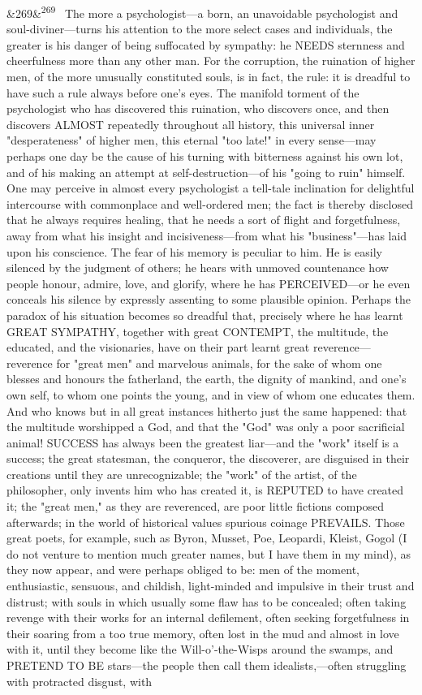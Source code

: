 \documentclass[12pt]{article}
\newcommand{\para}[1][]{\par\noindent\ifx&#1&\else\textsuperscript{\footnotesize #1}~\fi}
\begin{document}
\para[269] The more a psychologist---a born, an unavoidable psychologist and soul-diviner---turns his attention to the more select cases and individuals, the greater is his danger of being suffocated by sympathy: he NEEDS sternness and cheerfulness more than any other man. For the corruption, the ruination of higher men, of the more unusually constituted souls, is in fact, the rule: it is dreadful to have such a rule always before one's eyes. The manifold torment of the psychologist who has discovered this ruination, who discovers once, and then discovers ALMOST repeatedly throughout all history, this universal inner "desperateness" of higher men, this eternal "too late!" in every sense---may perhaps one day be the cause of his turning with bitterness against his own lot, and of his making an attempt at self-destruction---of his "going to ruin" himself. One may perceive in almost every psychologist a tell-tale inclination for delightful intercourse with commonplace and well-ordered men; the fact is thereby disclosed that he always requires healing, that he needs a sort of flight and forgetfulness, away from what his insight and incisiveness---from what his "business"---has laid upon his conscience. The fear of his memory is peculiar to him. He is easily silenced by the judgment of others; he hears with unmoved countenance how people honour, admire, love, and glorify, where he has PERCEIVED---or he even conceals his silence by expressly assenting to some plausible opinion. Perhaps the paradox of his situation becomes so dreadful that, precisely where he has learnt GREAT SYMPATHY, together with great CONTEMPT, the multitude, the educated, and the visionaries, have on their part learnt great reverence---reverence for "great men" and marvelous animals, for the sake of whom one blesses and honours the fatherland, the earth, the dignity of mankind, and one's own self, to whom one points the young, and in view of whom one educates them. And who knows but in all great instances hitherto just the same happened: that the multitude worshipped a God, and that the "God" was only a poor sacrificial animal! SUCCESS has always been the greatest liar---and the "work" itself is a success; the great statesman, the conqueror, the discoverer, are disguised in their creations until they are unrecognizable; the "work" of the artist, of the philosopher, only invents him who has created it, is REPUTED to have created it; the "great men," as they are reverenced, are poor little fictions composed afterwards; in the world of historical values spurious coinage PREVAILS. Those great poets, for example, such as Byron, Musset, Poe, Leopardi, Kleist, Gogol (I do not venture to mention much greater names, but I have them in my mind), as they now appear, and were perhaps obliged to be: men of the moment, enthusiastic, sensuous, and childish, light-minded and impulsive in their trust and distrust; with souls in which usually some flaw has to be concealed; often taking revenge with their works for an internal defilement, often seeking forgetfulness in their soaring from a too true memory, often lost in the mud and almost in love with it, until they become like the Will-o'-the-Wisps around the swamps, and PRETEND TO BE stars---the people then call them idealists,---often struggling with protracted disgust, with 
\end{document}
